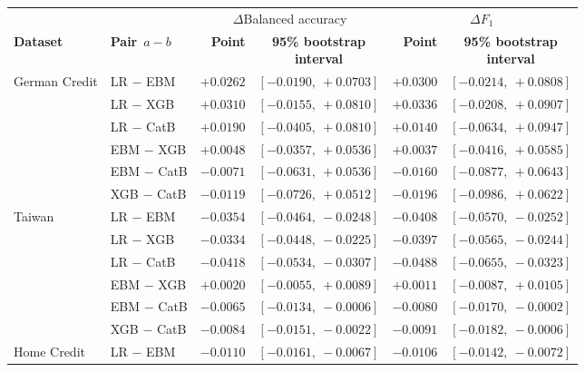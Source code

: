 \begin{table}[!t]
\centering
\footnotesize
\setlength{\tabcolsep}{4pt}
\begin{tabular}{@{}llrcrc@{}}
\toprule
                 &                     & \multicolumn{2}{c}{$\Delta$Balanced accuracy} & \multicolumn{2}{c}{$\Delta F_1$} \\
\cmidrule(lr){3-4}\cmidrule(lr){5-6}
\textbf{Dataset} & \textbf{Pair}~$a-b$ & \textbf{Point} & \shortstack{\textbf{95\% bootstrap}\\\textbf{interval}} & \textbf{Point} & \shortstack{\textbf{95\% bootstrap}\\\textbf{interval}} \\
\midrule
German Credit    & LR $-$ EBM   & $+0.0262$ & $[-0.0190,\ +0.0703]$ & $+0.0300$ & $[-0.0214,\ +0.0808]$ \\
                 & LR $-$ XGB   & $+0.0310$ & $[-0.0155,\ +0.0810]$ & $+0.0336$ & $[-0.0208,\ +0.0907]$ \\
                 & LR $-$ CatB  & $+0.0190$ & $[-0.0405,\ +0.0810]$ & $+0.0140$ & $[-0.0634,\ +0.0947]$ \\
                 & EBM $-$ XGB  & $+0.0048$ & $[-0.0357,\ +0.0536]$ & $+0.0037$ & $[-0.0416,\ +0.0585]$ \\
                 & EBM $-$ CatB & $-0.0071$ & $[-0.0631,\ +0.0536]$ & $-0.0160$ & $[-0.0877,\ +0.0643]$ \\
                 & XGB $-$ CatB & $-0.0119$ & $[-0.0726,\ +0.0512]$ & $-0.0196$ & $[-0.0986,\ +0.0622]$ \\
\midrule
Taiwan           & LR $-$ EBM   & $-0.0354$ & $[-0.0464,\ -0.0248]$ & $-0.0408$ & $[-0.0570,\ -0.0252]$ \\
                 & LR $-$ XGB   & $-0.0334$ & $[-0.0448,\ -0.0225]$ & $-0.0397$ & $[-0.0565,\ -0.0244]$ \\
                 & LR $-$ CatB  & $-0.0418$ & $[-0.0534,\ -0.0307]$ & $-0.0488$ & $[-0.0655,\ -0.0323]$ \\
                 & EBM $-$ XGB  & $+0.0020$ & $[-0.0055,\ +0.0089]$ & $+0.0011$ & $[-0.0087,\ +0.0105]$ \\
                 & EBM $-$ CatB & $-0.0065$ & $[-0.0134,\ -0.0006]$ & $-0.0080$ & $[-0.0170,\ -0.0002]$ \\
                 & XGB $-$ CatB & $-0.0084$ & $[-0.0151,\ -0.0022]$ & $-0.0091$ & $[-0.0182,\ -0.0006]$ \\
\midrule
Home Credit      & LR $-$ EBM   & $-0.0110$ & $[-0.0161,\ -0.0067]$ & $-0.0106$ & $[-0.0142,\ -0.0072]$ \\

\end{tabular}
\end{table}
